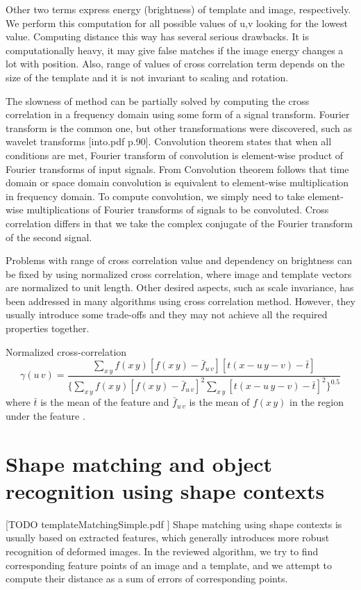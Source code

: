 Other two terms express energy (brightness) of template and image, respectively. We perform this computation for all possible values of u,v looking for the lowest value. Computing distance this way has several serious drawbacks. It is computationally heavy, it may give false matches if the image energy changes a lot with position. Also, range of values of cross correlation term depends on the size of the template and it is not invariant to scaling and rotation. 

The slowness of method can be partially solved by computing the cross correlation in a frequency domain using some form of a signal transform. Fourier transform is the common one, but other transformations were discovered, such as wavelet transforms [into.pdf p.90]. Convolution theorem states that when all conditions are met, Fourier transform of convolution is element-wise product of Fourier transforms of input signals. From Convolution theorem follows that time domain or space domain convolution is equivalent to element-wise multiplication in frequency domain. To compute convolution, we simply need to take element-wise multiplications of Fourier transforms of signals to be convoluted. Cross correlation differs in that we take the complex conjugate of the Fourier transform of the second signal.

Problems with range of cross correlation value and dependency on brightness can be fixed by using normalized cross correlation, where image and template vectors are normalized to unit length. Other desired aspects, such as scale invariance, has been addressed in many algorithms using cross correlation method. However, they usually introduce some trade-offs and they may not achieve all the required properties together. 

Normalized cross-correlation
\begin{equation*}
\gamma(u\,v) = \frac{\sum_{x\,y}f(x\,y) [f(x\,y)-\bar{f}_{u\,v}][t(x-u\,y-v)-\bar{t}]} {\{ \sum_{x\,y}f(x\,y) [f(x\,y)-\bar{f}_{u\,v}]^2 \sum_{x\,y}[t(x-u\,y-v)-\bar{t}]^2  \}^{0.5}}
\end{equation*}
where $\bar{t}$ is the mean of the feature and $\bar{f}_{u\,v}$ is the mean of $f(x\,y)$ in the region under the feature \cite{crossCorrLewis}.

\section{Shape matching and object recognition using shape contexts}
[TODO templateMatchingSimple.pdf ]
Shape matching using shape contexts is usually based on extracted features, which generally introduces more robust recognition of deformed images. In the reviewed algorithm, we try to find corresponding feature points of an image and a template, and we attempt to compute their distance as a sum of errors of corresponding points.

